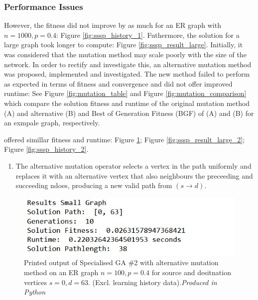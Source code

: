 \documentclass[
	a4paper, %
	10pt, %
	unnumberedsections, %
	twoside, %
]{LTJournalArticle}
\begin{document}
\subsubsection{Performance Issues} However, the fitness did not improve by as much for an ER graph with \(n = 1000, p = 0.4\): Figure \ref{fig:sssp_history_1}. Futhermore, the solution for a large graph took longer to compute: Figure \ref{fig:sssp_result_large}. Initially, it was considered that the mutation method may scale poorly with the size of the network. In order to rectify and investigate this, an alternative mutation method was proposed,  implemented and investigated. The new method failed to perform as expected in terms of fitness and convergence and did not offer improved runtime: See Figure \ref{fig:mutation_table} and Figure \ref{fig:mutation_comparison} which compare the solution fitness and runtime of the original mutation method (A) and alternative (B) and Best of Generation Fitness (BGF) of (A) and (B) for an exmpale graph, respectively. 

offered simillar fitness and runtime: Figure \ref{fig:sssp_result_small_2}; Figure \ref{fig:sssp_result_large_2}; Figure \ref{fig:sssp_history_2}. \\

\begin{enumerate}
	\item The alternative mutation operator selects a vertex in the path uniformly and replaces it with an alternative vertex that also neighbours the preceeding and succeeding ndoes, producing a new valid path from \((s \rightarrow d)\). 
\end{enumerate}

\begin{figure}[H]
	\includegraphics[width=\linewidth]{Figures/sssp/result_small_2.jpg}
	\caption{Printed output of Specialised GA \#2 with alternative mutation method on an ER graph \(n = 100, p = 0.4\) for source and desitnation vertices \(s = 0, d = 63\). (Excl. learning history data).\emph{Produced in Python}}
	\label{fig:sssp_result_small_2}
\end{figure}
\end{document}

